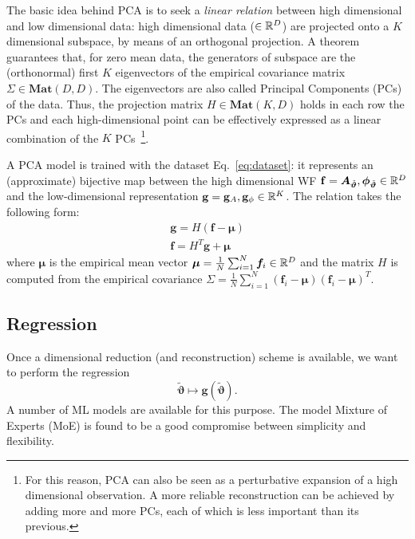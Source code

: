 The basic idea behind PCA is to seek a \textit{linear relation} between high dimensional and low dimensional data: high dimensional data ($\in \mathbb{R}^D$) are projected onto a $K$ dimensional subspace, by means of an orthogonal projection.
A theorem~\cite[Sec. 12.2.1]{murphy2012machine} guarantees that, for zero mean data, the generators of subspace are the (orthonormal) first $K$ eigenvectors of the empirical covariance matrix $\Sigma \in \mathbf{Mat}(D,D)$. The eigenvectors are also called Principal Components (PCs) of the data.
Thus, the projection matrix $H\in \mathbf{Mat}(K,D)$ holds in each row the PCs and each high-dimensional point can be effectively expressed as a linear combination of the $K$ PCs~\footnote{For this reason, PCA can also be seen as a perturbative expansion of a high dimensional observation. A more reliable reconstruction can be achieved by adding more and more PCs, each of which is less important than its previous.}.

A PCA model is trained with the dataset Eq.~\eqref{eq:dataset}: it represents an (approximate) bijective map between the high dimensional WF $\mathbf{f} = \boldsymbol{A}_{\tilde{\boldsymbol{\vartheta}}}, \boldsymbol{\phi}_{\tilde{\boldsymbol{\vartheta}}} \in \mathbb{R}^D$ and the low-dimensional representation $\mathbf{g} = \mathbf{g}_A , \mathbf{g}_\phi \in \mathbb{R}^K$.
The relation takes the following form:
\begin{align}
	\mathbf{g} = H (\mathbf{f} - \boldsymbol{\mu}) \label{eq:PCA_reduction_model}\\
	\mathbf{f} = H^T \mathbf{g} + \boldsymbol{\mu} \label{eq:PCA_reconstruction_model}
\end{align}
where $\boldsymbol{\mu}$ is the empirical mean vector ${\boldsymbol{\mu} = \frac{1}{N} \sum_{i=1}^N \boldsymbol{f}_i \in \mathbb{R}^D}$ and the matrix $H$ is computed from the empirical covariance ${\Sigma = \frac{1}{N} \sum_{i=1}^N (\mathbf{f}_i-\boldsymbol{\mu}) (\mathbf{f}_i-\boldsymbol{\mu})^T}$.


\subsection{Regression}
Once a dimensional reduction (and reconstruction) scheme is available, we want to perform the regression
\begin{equation} \label{eq:regression_model}
	{\tilde{\boldsymbol{\vartheta}}} \longmapsto \boldsymbol{g}({\tilde{\boldsymbol{\vartheta}}}).
\end{equation}
A number of ML models are available for this purpose. The model Mixture of Experts (MoE) \cite{Jacobs1991AdaptiveMoE} \cite[ch. 11]{murphy2012machine} is found to be a good compromise between simplicity and flexibility.

